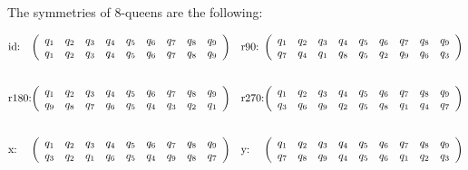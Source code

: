 \documentclass{cons-beamer}
\begin{document}
\begin{frame}
  \begin{example}[Continued]
    The symmetries of 8-queens are the following:

    \scriptsize
    \[
    \begin{array}{@{}ll@{}}
    \makebox[2em][l]{\text{id:}} 
      \left(
      \begin{array}{ccccccccc}
      q_1 & q_2 & q_3 & q_4 & q_5 & q_6 & q_7 & q_8 & q_9 \\
      q_1 & q_2 & q_3 & q_4 & q_5 & q_6 & q_7 & q_8 & q_9
      \end{array}
      \right) &
    \makebox[2em][l]{\text{r90:}} 
      \left(
      \begin{array}{ccccccccc}
      q_1 & q_2 & q_3 & q_4 & q_5 & q_6 & q_7 & q_8 & q_9 \\
      q_7 & q_4 & q_1 & q_8 & q_5 & q_2 & q_9 & q_6 & q_3
      \end{array}
      \right) \\[3em]
      
    \makebox[2em][l]{\text{r180:}} 
      \left(
      \begin{array}{ccccccccc}
      q_1 & q_2 & q_3 & q_4 & q_5 & q_6 & q_7 & q_8 & q_9 \\
      q_9 & q_8 & q_7 & q_6 & q_5 & q_4 & q_3 & q_2 & q_1
      \end{array}
      \right) &
    \makebox[2em][l]{\text{r270:}} 
      \left(
      \begin{array}{ccccccccc}
      q_1 & q_2 & q_3 & q_4 & q_5 & q_6 & q_7 & q_8 & q_9 \\
      q_3 & q_6 & q_9 & q_2 & q_5 & q_8 & q_1 & q_4 & q_7
      \end{array}
      \right) \\[3em]
      
    \makebox[2em][l]{\text{x:}} 
      \left(
      \begin{array}{ccccccccc}
      q_1 & q_2 & q_3 & q_4 & q_5 & q_6 & q_7 & q_8 & q_9 \\
      q_3 & q_2 & q_1 & q_6 & q_5 & q_4 & q_9 & q_8 & q_7
      \end{array}
      \right) &
    \makebox[2em][l]{\text{y:}} 
      \left(
      \begin{array}{ccccccccc}
      q_1 & q_2 & q_3 & q_4 & q_5 & q_6 & q_7 & q_8 & q_9 \\
      q_7 & q_8 & q_9 & q_4 & q_5 & q_6 & q_1 & q_2 & q_3
      \end{array}
      \right) \\[3em]
      

\end{array}\]
\end{example}
\end{frame}
\end{document}
